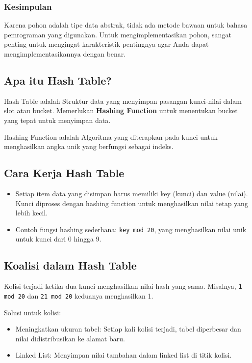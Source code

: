 \documentclass{article}
\begin{document}
\subsubsection{Kesimpulan}
Karena pohon adalah tipe data abstrak, tidak ada metode bawaan untuk bahasa pemrograman yang digunakan. Untuk mengimplementasikan pohon, sangat penting untuk mengingat karakteristik pentingnya agar Anda dapat mengimplementasikannya dengan benar.

\subsection{Apa itu Hash Table?}
Hash Table adalah Struktur data yang menyimpan pasangan kunci-nilai dalam slot atau bucket. Memerlukan \textbf{Hashing Function} untuk menentukan bucket yang tepat untuk menyimpan data.

Hashing Function adalah Algoritma yang diterapkan pada kunci untuk menghasilkan angka unik yang berfungsi sebagai indeks.

\subsection{Cara Kerja Hash Table}
\begin{itemize}
    \item Setiap item data yang disimpan harus memiliki key (kunci) dan value (nilai). Kunci diproses dengan hashing function untuk menghasilkan nilai tetap yang lebih kecil.
    \item Contoh fungsi hashing sederhana: \verb|key mod 20|, yang menghasilkan nilai unik untuk kunci dari 0 hingga 9.
\end{itemize}

\subsection{Koalisi dalam Hash Table}
Kolisi terjadi ketika dua kunci menghasilkan nilai hash yang sama. Misalnya, \verb|1 mod 20| dan \verb|21 mod 20| keduanya menghasilkan 1.

Solusi untuk kolisi:
\begin{itemize}
    \item Meningkatkan ukuran tabel: Setiap kali kolisi terjadi, tabel diperbesar dan nilai didistribusikan ke alamat baru.
    \item Linked List: Menyimpan nilai tambahan dalam linked list di titik kolisi.
\end{itemize}
\end{document}
